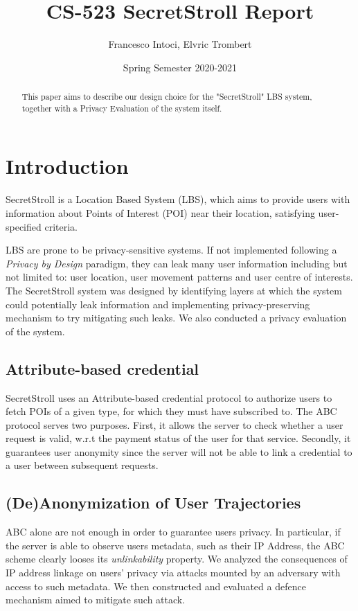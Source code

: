 \documentclass[10pt,conference,compsocconf]{IEEEtran}
\title{CS-523 SecretStroll Report}
\author{Francesco Intoci, Elvric Trombert}
\date{Spring Semester 2020-2021}
\begin{document}
\maketitle

\begin{abstract}
    This paper aims to describe our design choice for the "SecretStroll" LBS system, together with a Privacy Evaluation of the system itself.
\end{abstract}

\section{Introduction}
SecretStroll is a Location Based System (LBS), which aims to provide users with
information about Points of Interest (POI) near their location, satisfying
user-specified criteria.

LBS are prone to be privacy-sensitive systems.
If not implemented following a \textit{Privacy by Design} paradigm, they can leak many user information including
but not limited to: user location, user movement patterns and user centre of interests.
The SecretStroll system was designed by identifying layers at which the system could potentially leak information and
implementing privacy-preserving mechanism to try mitigating such leaks.
We also conducted a privacy evaluation of the system.

\subsection{Attribute-based credential}
SecretStroll uses an Attribute-based credential protocol to authorize users
to fetch POIs of a given type, for which they must have subscribed to.
The ABC protocol serves two purposes.
First, it allows the server to check whether a user request is valid, w.r.t the payment status of the user for that service.
Secondly, it guarantees user anonymity since the server will not be able to link a credential to a user between subsequent requests.

\subsection{(De)Anonymization of User Trajectories}
ABC alone are not enough in order to guarantee users privacy.
In particular, if the server is able to observe users metadata, such as their IP Address, the ABC scheme clearly looses its
\textit{unlinkability} property.
We analyzed the consequences of IP address linkage on users' privacy via attacks mounted by an adversary with access to such metadata.
We then constructed and evaluated a defence mechanism aimed to mitigate such attack.
\end{document}
